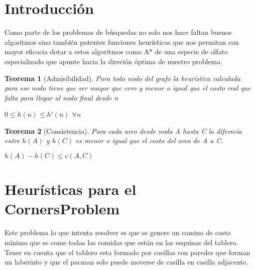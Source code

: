 \documentclass[a4paper,10pt,twocolumn]{article}
\newtheorem{teo}{Teorema}
\begin{document}

\section{Introducción}\label{sec:intro}
Como parte de los problemas de búsquedas no solo nos hace faltan buenos algoritmos sino también potentes funciones heurísticas que nos permitan con mayor eficacia dotar a estos algoritmos como A* de una especie de olfato especializado que apunte hacia la direción óptima de nuestro problema.

     


\begin{teo}[Admisibilidad]
		Para todo nodo del grafo la heurística calculada para ese nodo tiene que ser mayor que cero y menor o igual que el costo real que falta para llegar al nodo final desde n
		
		$0 \le h(n) \le h'(n)$ $\forall n$ 			
\end{teo}

\begin{teo}[Consistencia]
Para cada arco desde noda A hasta C la diferecia entre $h(A)$ y $h(C)$ es menor o igual que el costo del arco de A a C.

$h(A) - h(C) \le c(A,C) $


	
\end{teo}

\section{Heurísticas para el CornersProblem }\label{sec:dev}
Este problema lo que intenta resolver es que se genere un camino de costo mínimo que se come todas las comidas que están en las esquinas del tablero.
Tener en cuenta que el tablero esta formado por casillas con paredes que forman un laberinto y que el pacman solo puede moverse de casilla en casilla adjacente. 
\end{document}
